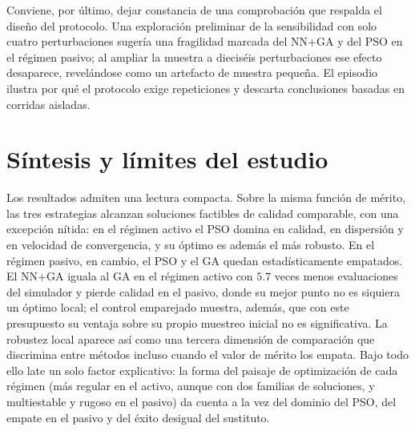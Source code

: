 Conviene, por último, dejar constancia de una comprobación que respalda el diseño del
protocolo. Una exploración preliminar de la sensibilidad con solo cuatro perturbaciones
sugería una fragilidad marcada del NN+GA y del PSO en el régimen pasivo; al ampliar la
muestra a dieciséis perturbaciones ese efecto desaparece, revelándose como un artefacto
de muestra pequeña. El episodio ilustra por qué el protocolo exige repeticiones y descarta
conclusiones basadas en corridas aisladas.

\section{Síntesis y límites del estudio}
\label{sec:res_sintesis}

Los resultados admiten una lectura compacta. Sobre la misma función de mérito, las tres
estrategias alcanzan soluciones factibles de calidad comparable, con una excepción
nítida: en el régimen activo el PSO domina en calidad, en dispersión y en velocidad de
convergencia, y su óptimo es además el más robusto. En el régimen pasivo, en cambio, el
PSO y el GA quedan estadísticamente empatados. El NN+GA iguala al GA en el régimen activo con
$5{.}7$ veces menos evaluaciones del simulador y pierde calidad en el pasivo, donde su
mejor punto no es siquiera un óptimo local; el control emparejado muestra, además, que
con este presupuesto su ventaja sobre su propio muestreo inicial no es significativa. La robustez local aparece así como
una tercera dimensión de comparación que discrimina entre métodos incluso cuando el valor
de mérito los empata. Bajo todo ello late un solo factor explicativo: la forma del paisaje
de optimización de cada régimen (más regular en el activo, aunque con dos familias de soluciones, y multiestable y
rugoso en el pasivo) da cuenta a la vez del dominio del PSO, del empate en el pasivo y del
éxito desigual del sustituto.

